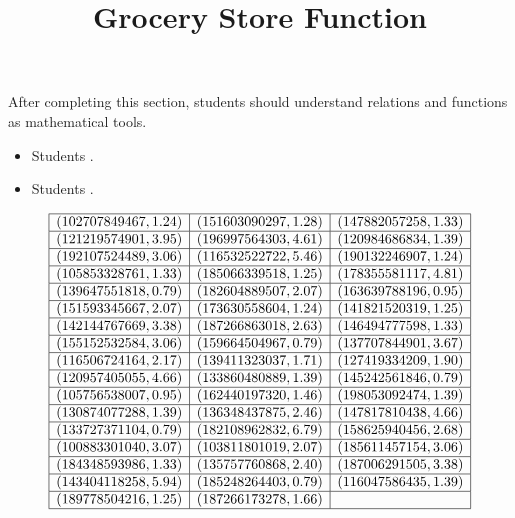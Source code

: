 \documentclass{ximera}
\title{Grocery Store Function}
\begin{document}
\begin{abstract}
\end{abstract}

\maketitle

\begin{sectionOutcomes}

After completing this section, students should understand relations and functions as mathematical tools. 

\begin{itemize}
\item Students .
\item Students .
\end{itemize}

\end{sectionOutcomes}




\[
\begin{array}{|l|l|l|}
\hline
(102707849467, 1.24) & (151603090297, 1.28) & (147882057258, 1.33) \\\hline
(121219574901, 3.95) & (196997564303, 4.61) & (120984686834, 1.39) \\\hline
(192107524489, 3.06) & (116532522722, 5.46) & (190132246907, 1.24) \\\hline
(105853328761, 1.33) & (185066339518, 1.25) & (178355581117, 4.81) \\\hline 
(139647551818, 0.79) & (182604889507, 2.07) & (163639788196, 0.95) \\\hline 
(151593345667, 2.07) & (173630558604, 1.24) & (141821520319, 1.25) \\\hline 
(142144767669, 3.38) & (187266863018, 2.63) & (146494777598, 1.33) \\\hline 
(155152532584, 3.06) & (159664504967, 0.79) & (137707844901, 3.67) \\\hline 
(116506724164, 2.17) & (139411323037, 1.71) & (127419334209, 1.90) \\\hline 
(120957405055, 4.66) & (133860480889, 1.39) & (145242561846, 0.79) \\\hline 
(105756538007, 0.95) & (162440197320, 1.46) & (198053092474, 1.39) \\\hline 
(130874077288, 1.39) & (136348437875, 2.46) & (147817810438, 4.66) \\\hline 
(133727371104, 0.79) & (182108962832, 6.79) & (158625940456, 2.68) \\\hline 
(100883301040, 3.07) & (103811801019, 2.07) & (185611457154, 3.06) \\\hline 
(184348593986, 1.33) & (135757760868, 2.40) & (187006291505, 3.38) \\\hline 
(143404118258, 5.94) & (185248264403, 0.79) & (116047586435, 1.39) \\\hline 
(189778504216, 1.25) & (187266173278, 1.66) &    \\\hline
\end{array}
\]
\end{document}
